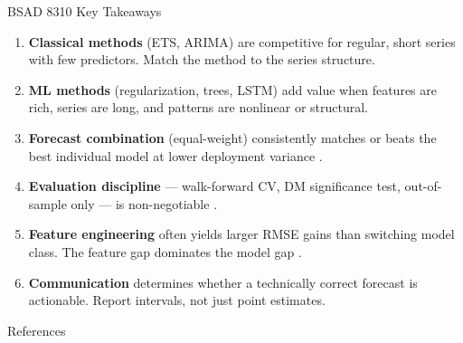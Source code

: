 \documentclass[aspectratio=169, 10pt]{beamer}
\begin{document}
\begin{frame}{BSAD 8310 Key Takeaways}
  \begin{keybox}
    \footnotesize
    \begin{enumerate}\setlength{\itemsep}{2pt}
      \item \textbf{Classical methods} (ETS, ARIMA) are competitive for
            regular, short series with few predictors.
            Match the method to the series structure.
      \item \textbf{ML methods} (regularization, trees, LSTM) add value
            when features are rich, series are long, and patterns are
            nonlinear or structural.
      \item \textbf{Forecast combination} (equal-weight) consistently
            matches or beats the best individual model at lower
            deployment variance \parencite{BatesGranger1969,Timmermann2006}.
      \item \textbf{Evaluation discipline} --- walk-forward CV, DM
            significance test, out-of-sample only --- is
            non-negotiable \parencite{Diebold1995}.
      \item \textbf{Feature engineering} often yields larger RMSE gains
            than switching model class. The feature gap dominates the
            model gap \parencite{Makridakis2020}.
      \item \textbf{Communication} determines whether a technically
            correct forecast is actionable.
            Report intervals, not just point estimates.
    \end{enumerate}
  \end{keybox}
  \smallskip
\end{frame}

\begin{frame}[allowframebreaks]{References}
  \printbibliography[heading=none]
\end{frame}
\end{document}

